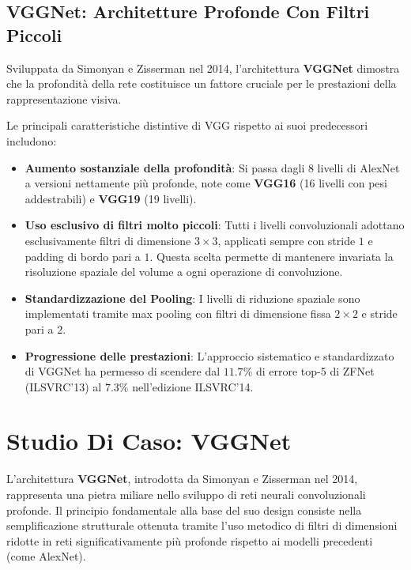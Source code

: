 ﻿\documentclass[11pt, a4paper]{article}
\begin{document}
\subsection{VGGNet: Architetture Profonde Con Filtri Piccoli}

Sviluppata da Simonyan e Zisserman nel 2014, l'architettura \textbf{VGGNet} dimostra che la profondità della rete costituisce un fattore cruciale per le prestazioni della rappresentazione visiva.


Le principali caratteristiche distintive di VGG rispetto ai suoi predecessori includono:
\begin{itemize}
    \item \textbf{Aumento sostanziale della profondità}: Si passa dagli 8 livelli di AlexNet a versioni nettamente più profonde, note come \textbf{VGG16} (16 livelli con pesi addestrabili) e \textbf{VGG19} (19 livelli).
    \item \textbf{Uso esclusivo di filtri molto piccoli}: Tutti i livelli convoluzionali adottano esclusivamente filtri di dimensione $3 \times 3$, applicati sempre con stride $1$ e padding di bordo pari a $1$. Questa scelta permette di mantenere invariata la risoluzione spaziale del volume a ogni operazione di convoluzione.
    \item \textbf{Standardizzazione del Pooling}: I livelli di riduzione spaziale sono implementati tramite max pooling con filtri di dimensione fissa $2 \times 2$ e stride pari a $2$.
    \item \textbf{Progressione delle prestazioni}: L'approccio sistematico e standardizzato di VGGNet ha permesso di scendere dal $11.7\%$ di errore top-5 di ZFNet (ILSVRC'13) al \textbf{$7.3\%$} nell'edizione ILSVRC'14.
\end{itemize}

\section{Studio Di Caso: VGGNet}

L'architettura \textbf{VGGNet}, introdotta da Simonyan e Zisserman nel 2014, rappresenta una pietra miliare nello sviluppo di reti neurali convoluzionali profonde. Il principio fondamentale alla base del suo design consiste nella semplificazione strutturale ottenuta tramite l'uso metodico di filtri di dimensioni ridotte in reti significativamente più profonde rispetto ai modelli precedenti (come AlexNet).
\end{document}
